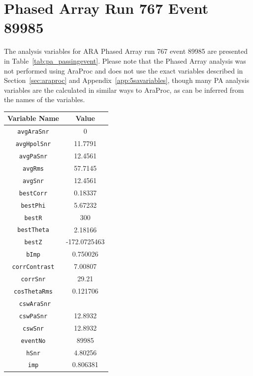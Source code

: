 \chapter{Phased Array Run 767 Event 89985 \label{app:pa_passingevent}}

    The analysis variables for ARA Phased Array run 767 event 89985 are presented in Table~\ref{tab:pa_passingevent}. 
    Please note that the Phased Array analysis was not performed using AraProc and does not use the exact variables described in Section~\ref{sec:araproc} and Appendix~\ref{app:5savariables}, though many PA analysis variables are the calculated in similar ways to AraProc, as can be inferred from the names of the variables. 

    \begin{table}
        \centering
        \begin{tabular}{cc}
            Variable Name & Value \\
            \hline
            \hline
            \texttt{avgAraSnr} & 0 \\
            \texttt{avgHpolSnr} & 11.7791 \\
            \texttt{avgPaSnr} & 12.4561 \\
            \texttt{avgRms} & 57.7145 \\
            \texttt{avgSnr} & 12.4561 \\
            \texttt{bestCorr} & 0.18337 \\
            \texttt{bestPhi} & 5.67232 \\
            \texttt{bestR} & 300 \\
            \texttt{bestTheta} & 2.18166 \\
            \texttt{bestZ} & -172.0725463 \\
            \texttt{bImp} & 0.750026 \\
            \texttt{corrContrast} & 7.00807 \\
            \texttt{corrSnr} & 29.21 \\
            \texttt{cosThetaRms} & 0.121706 \\
            \texttt{ cswAraSnr} &   \\
            \texttt{cswPaSnr} & 12.8932 \\
            \texttt{cswSnr} & 12.8932 \\
            \texttt{eventNo} & 89985 \\
            \texttt{hSnr} & 4.80256 \\
            \texttt{imp} & 0.806381 \\

\end{tabular}
\end{table}
